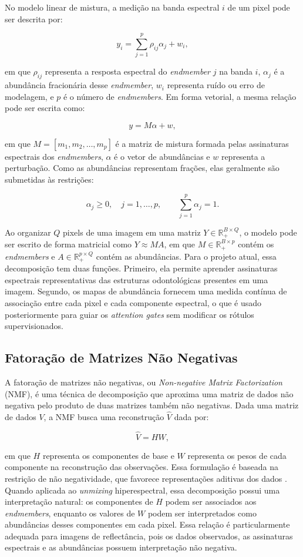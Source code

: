 \documentclass[conference]{IEEEtran}
\begin{document}
No modelo linear de mistura, a medição na banda espectral $i$ de um pixel pode
ser descrita por:

\[
y_i = \sum_{j=1}^{p} \rho_{ij}\alpha_j + w_i,
\]

em que $\rho_{ij}$ representa a resposta espectral do \textit{endmember} $j$ na
banda $i$, $\alpha_j$ é a abundância fracionária desse \textit{endmember},
$w_i$ representa ruído ou erro de modelagem, e $p$ é o número de
\textit{endmembers}. Em forma vetorial, a mesma relação pode ser escrita como:

\[
y = M\alpha + w,
\]

em que $M = [m_1, m_2, \ldots, m_p]$ é a matriz de mistura formada pelas
assinaturas espectrais dos \textit{endmembers}, $\alpha$ é o vetor de
abundâncias e $w$ representa a perturbação. Como as abundâncias representam
frações, elas geralmente são submetidas às restrições:

\[
\alpha_j \ge 0,\quad j = 1,\ldots,p,\qquad
\sum_{j=1}^{p}\alpha_j = 1.
\]

Ao organizar $Q$ pixels de uma imagem em uma matriz
$Y\in\mathbb{R}_{+}^{B\times Q}$, o modelo pode ser escrito de forma matricial
como $Y \approx MA$, em que $M\in\mathbb{R}_{+}^{B\times p}$ contém os
\textit{endmembers} e $A\in\mathbb{R}_{+}^{p\times Q}$ contém as abundâncias.
Para o projeto atual, essa decomposição tem duas funções. Primeiro, ela permite
aprender assinaturas espectrais representativas das estruturas odontológicas
presentes em uma imagem. Segundo, os mapas de abundância fornecem uma medida
contínua de associação entre cada pixel e cada componente espectral, o que é
usado posteriormente para guiar os \textit{attention gates} sem modificar os
rótulos supervisionados.

\subsection{Fatoração de Matrizes Não Negativas}

A fatoração de matrizes não negativas, ou \textit{Non-negative Matrix
Factorization} (NMF), é uma técnica de decomposição que aproxima uma matriz de
dados não negativa pelo produto de duas matrizes também não negativas. Dada uma
matriz de dados $V$, a NMF busca uma reconstrução $\hat{V}$ dada por:

\[
\hat{V} = HW,
\]

em que $H$ representa os componentes de base e $W$ representa os pesos de cada
componente na reconstrução das observações. Essa formulação é baseada na
restrição de não negatividade, que favorece representações aditivas dos dados
\cite{lee2000nmf}. Quando aplicada ao \textit{unmixing} hiperespectral, essa
decomposição possui uma interpretação natural: os componentes de $H$ podem ser
associados aos \textit{endmembers}, enquanto os valores de $W$ podem ser
interpretados como abundâncias desses componentes em cada pixel. Essa relação é
particularmente adequada para imagens de
reflectância, pois os dados observados, as assinaturas espectrais e as
abundâncias possuem interpretação não negativa.
\end{document}
